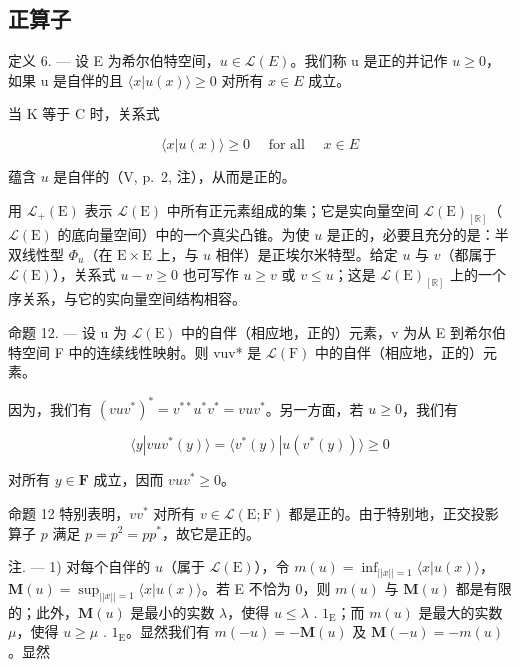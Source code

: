 \subsection{正算子}

定义 6. --- 设 E 为希尔伯特空间，\(u \in \mathcal{L}(E)\)。我们称 u 是正的并记作 \(u \geqslant 0\)，如果 u 是自伴的且 \(\langle x|u(x) \rangle \geqslant 0\) 对所有 \(x \in E\) 成立。

当 K 等于 C 时，关系式

\[
\langle x | u (x) \rangle \geqslant 0 \quad \text { for   all } \quad x \in E
\]

蕴含 \(u\) 是自伴的（V, p.~2, 注），从而是正的。

用 \(\mathcal{L}_{+}(\mathrm{E})\) 表示 \(\mathcal{L}(\mathrm{E})\) 中所有正元素组成的集；它是实向量空间 \(\mathcal{L}(\mathrm{E})_{[\mathbb{R}]}\)（\(\mathcal{L}(\mathrm{E})\) 的底向量空间）中的一个真尖凸锥。为使 \(u\) 是正的，必要且充分的是：半双线性型 \(\Phi_u\)（在 \(\mathrm{E} \times \mathrm{E}\) 上，与 \(u\) 相伴）是正埃尔米特型。给定 \(u\) 与 \(v\)（都属于 \(\mathcal{L}(\mathrm{E})\)），关系式 \(u - v \geqslant 0\) 也可写作 \(u \geqslant v\) 或 \(v \leqslant u\)；这是 \(\mathcal{L}(\mathrm{E})_{[\mathbb{R}]}\) 上的一个序关系，与它的实向量空间结构相容。

命题 12. --- 设 u 为 \(\mathcal{L}(\mathrm{E})\) 中的自伴（相应地，正的）元素，v 为从 E 到希尔伯特空间 F 中的连续线性映射。则 vuv* 是 \(\mathcal{L}(\mathrm{F})\) 中的自伴（相应地，正的）元素。

因为，我们有 \((vuv^{*})^{*} = v^{**}u^{*}v^{*} = vuv^{*}\)。另一方面，若 \(u \geqslant 0\)，我们有

\[
\langle y | v u v ^ {*} (y) \rangle = \langle v ^ {*} (y) | u (v ^ {*} (y)) \rangle \geqslant 0
\]

对所有 \(y \in \mathbf{F}\) 成立，因而 \(vuv^{*} \geqslant 0\)。

命题 12 特别表明，\(vv^*\) 对所有 \(v \in \mathcal{L}(\mathrm{E};\mathrm{F})\) 都是正的。由于特别地，正交投影算子 \(p\) 满足 \(p = p^2 = pp^*\)，故它是正的。

注. --- 1) 对每个自伴的 \(u\)（属于 \(\mathcal{L}(\mathrm{E})\)），令 \(m(u) = \inf_{||x|| = 1} \langle x|u(x) \rangle\)，\(\mathbf{M}(u) = \sup_{||x|| = 1} \langle x|u(x) \rangle\)。若 E 不恰为 0，则 \(m(u)\) 与 \(\mathbf{M}(u)\) 都是有限的；此外，\(\mathbf{M}(u)\) 是最小的实数 \(\lambda\)，使得 \(u \leqslant \lambda\) . \(1_{\mathrm{E}}\)；而 \(m(u)\) 是最大的实数 \(\mu\)，使得 \(u \geqslant \mu\) . \(1_{\mathrm{E}}\)。显然我们有 \(m(-u) = -\mathbf{M}(u)\) 及 \(\mathbf{M}(-u) = -m(u)\)。显然

